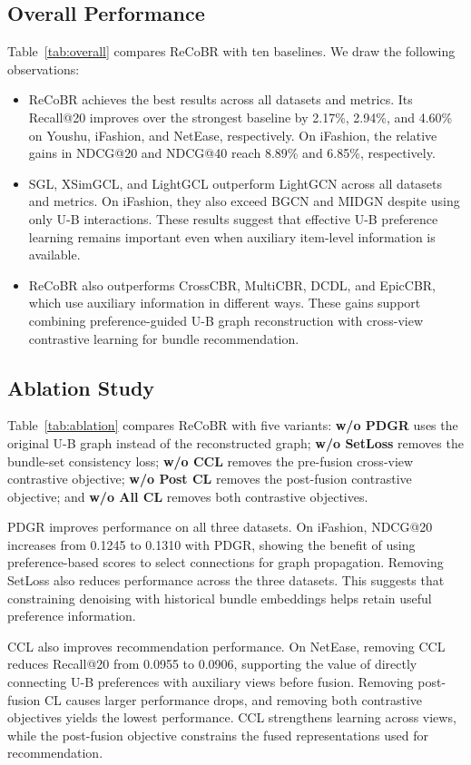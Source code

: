 \documentclass[letterpaper]{article}
\begin{document}
\subsection{Overall Performance}

Table~\ref{tab:overall} compares ReCoBR with ten baselines.
We draw the following observations:
\begin{itemize}
\item ReCoBR achieves the best results across all datasets and
metrics. Its Recall@20 improves over the strongest baseline by
2.17\%, 2.94\%, and 4.60\% on Youshu, iFashion, and NetEase,
respectively. On iFashion, the relative gains in NDCG@20 and
NDCG@40 reach 8.89\% and 6.85\%, respectively.
\item SGL, XSimGCL, and LightGCL outperform LightGCN across all
datasets and metrics. On iFashion, they also exceed BGCN and
MIDGN despite using only U-B interactions. These results suggest that effective U-B preference learning remains
important even when auxiliary item-level information is available.
\item ReCoBR also outperforms CrossCBR, MultiCBR, DCDL,
and EpicCBR, which use auxiliary information in different ways.
These gains support combining preference-guided U-B graph
reconstruction with cross-view contrastive learning for bundle
recommendation.
\end{itemize}


\subsection{Ablation Study}

Table~\ref{tab:ablation} compares ReCoBR with five variants:
\textbf{w/o PDGR} uses the original U-B graph instead of the
reconstructed graph; \textbf{w/o SetLoss} removes the bundle-set
consistency loss; \textbf{w/o CCL} removes the pre-fusion
cross-view contrastive objective; \textbf{w/o Post CL}
removes the post-fusion contrastive objective; and
\textbf{w/o All CL} removes both contrastive objectives.

PDGR improves performance on all three datasets. On iFashion,
NDCG@20 increases from 0.1245 to 0.1310 with PDGR, showing
the benefit of using preference-based scores to select connections for
graph propagation. Removing SetLoss also reduces performance
across the three datasets. This suggests that constraining denoising
with historical bundle embeddings helps retain useful preference
information.

CCL also improves recommendation performance. On NetEase,
removing CCL reduces Recall@20 from 0.0955 to 0.0906,
supporting the value of directly connecting U-B preferences
with auxiliary views before fusion. Removing post-fusion CL
causes larger performance drops, and removing both
contrastive objectives yields the lowest performance.
CCL strengthens learning across views, while the post-fusion
objective constrains the fused representations used for recommendation.
\end{document}

